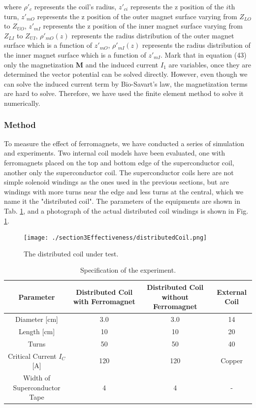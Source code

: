 where $\rho'_c$ represents the coil's radius,
$z'_{ci}$ represents the z position of the $i$th turn,
$z'_{mO}$ represents the z position of the outer magnet surface varying from $Z_{LO}$ to $Z_{UO}$,
$z'_{mI}$ represents the z position of the inner magnet surface varying from $Z_{LI}$ to $Z_{UI}$,
$\rho'_{mO}(z)$ represents the radius distribution of the outer magnet surface which is a function of $z'_{mO}$,
$\rho'_{mI}(z)$ represents the radius distribution of the inner magnet surface which is a function of $z'_{mI}$.
Mark that in equation (43) only the magnetization $\mathbf{M}$ and the induced current $I_1$ are variables,
once they are determined the vector potential can be solved directly.
However, even though we can solve the induced current term by Bio-Savart's law,
the magnetization terms are hard to solve.
Therefore, we have used the finite element method to solve it numerically.


\subsubsection{Method}
To measure the effect of ferromagnets, we have conducted a series of simulation and experiments.
Two internal coil models have been evaluated,
one with ferromagnets placed on the top and bottom edge of the superconductor coil,
another only the superconductor coil.
The superconductor coils here are not simple solenoid windings as the ones used in the previous sections,
but are windings with more turns near the edge and less turns at the central,
which we name it the "distributed coil".
The parameters of the equipments are shown in Tab. \ref{tab:distributedCoil},
and a photograph of the actual distributed coil windings is shown in Fig. \ref{fig:photoDistributedCoil}.
\begin{figure}[H]
  \texttt{[image: ./section3Effectiveness/distributedCoil.png]}
  \caption{The distributed coil under test.}
  \label{fig:photoDistributedCoil}
\end{figure}
\begin{table}[H]
  \centering
  \caption{Specification of the experiment.}
  \label{tab:distributedCoil}
  \begin{tabular}{cccc}\hline\hline
    Parameter & Distributed Coil with Ferromagnet & Distributed Coil without Ferromagnet & External Coil \\\hline
    Diameter [cm] & 3.0 & 3.0 & 14\\\hline
    Length [cm] & 10 & 10 & 20 \\\hline
    Turns & 50 & 50 & 40 \\\hline
    Critical Current $I_C$ [A] & 120 & 120 & Copper \\\hline
    Width of Superconductor Tape & 4 & 4 & -\\\hline\hline
  \end{tabular}
\end{table}

